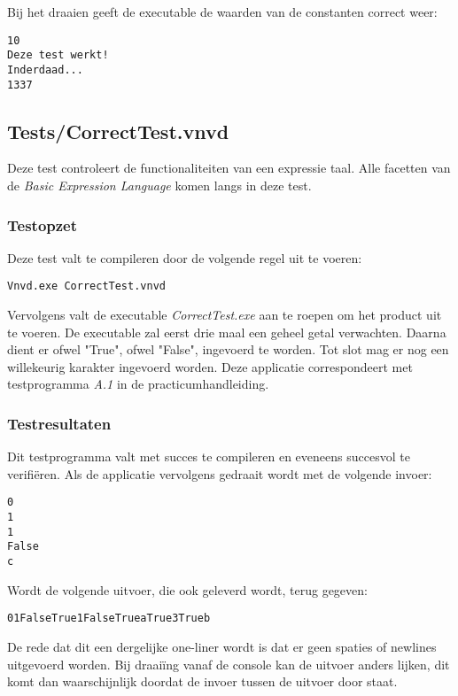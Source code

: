 Bij het draaien geeft de executable de waarden van de constanten correct weer:

\begin{lstlisting}
10
Deze test werkt!
Inderdaad...
1337
\end{lstlisting}

\subsection{Tests/CorrectTest.vnvd}
Deze test controleert de functionaliteiten van een expressie taal. Alle facetten van de \textit{Basic Expression Language} komen langs in deze test.

\subsubsection{Testopzet}
Deze test valt te compileren door de volgende regel uit te voeren:

\begin{lstlisting}
Vnvd.exe CorrectTest.vnvd
\end{lstlisting}

Vervolgens valt de executable \textit{CorrectTest.exe} aan te roepen om het product uit te voeren. De executable zal eerst drie maal een geheel getal verwachten. Daarna dient er ofwel "True", ofwel "False", ingevoerd te worden. Tot slot mag er nog een willekeurig karakter ingevoerd worden. Deze applicatie correspondeert met testprogramma \textit{A.1} in de practicumhandleiding.

\subsubsection{Testresultaten}
Dit testprogramma valt met succes te compileren en eveneens succesvol te verifi\"eren. Als de applicatie vervolgens gedraait wordt met de volgende invoer:

\begin{lstlisting}
0
1
1
False
c
\end{lstlisting}

Wordt de volgende uitvoer, die ook geleverd wordt, terug gegeven:

\begin{lstlisting}
01FalseTrue1FalseTrueaTrue3Trueb
\end{lstlisting}

De rede dat dit een dergelijke one-liner wordt is dat er geen spaties of newlines uitgevoerd worden. Bij draai\"ing vanaf de console kan de uitvoer anders lijken, dit komt dan waarschijnlijk doordat de invoer tussen de uitvoer door staat.

